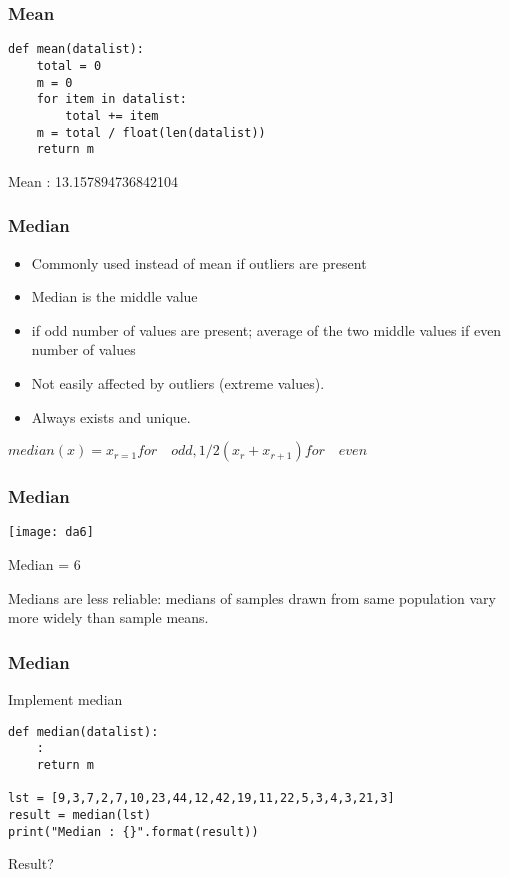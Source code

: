 \begin{frame}[fragile]\frametitle{Mean}
\begin{lstlisting}
def mean(datalist):
	total = 0
	m = 0
	for item in datalist:
		total += item
	m = total / float(len(datalist))
	return m
\end{lstlisting}
Mean : 13.157894736842104
\end{frame}

\begin{frame}[fragile]\frametitle{Median}	
\begin{itemize}
\item Commonly used instead of mean if outliers are present
\item Median is the middle value 
\item if odd number of values are present; average of the two middle values if even number of values
\item Not easily affected by outliers (extreme values). 
\item Always exists and unique.
\end{itemize}
$median(x) = x_{r=1} for \quad odd, 1/2(x_r + x_{r+1}) for \quad even$
\end{frame}


\begin{frame}[fragile]\frametitle{Median}	
\begin{center}
\texttt{[image: da6]}
\end{center}
Median = 6

Medians are less reliable: medians of samples drawn from same population vary more widely than sample means.
\end{frame}


\begin{frame}[fragile]\frametitle{Median}
Implement median
\begin{lstlisting}
def median(datalist):
	:
	return m

lst = [9,3,7,2,7,10,23,44,12,42,19,11,22,5,3,4,3,21,3]
result = median(lst)
print("Median : {}".format(result))
\end{lstlisting}
Result?
\end{frame}

